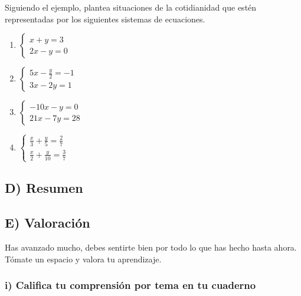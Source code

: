 \documentclass[12pt,a4paper]{article}
\begin{document}
Siguiendo el ejemplo, plantea situaciones de la cotidianidad que estén representadas por los siguientes sistemas de ecuaciones.

\begin{enumerate}[label=\alph*)]
    \item $\begin{cases} x + y = 3 \\ 2x - y = 0 \end{cases}$

    \item $\begin{cases} 5x - \frac{y}{2} = -1 \\ 3x - 2y = 1 \end{cases}$

    \item $\begin{cases} -10x - y = 0 \\ 21x - 7y = 28 \end{cases}$

    \item $\begin{cases} \frac{x}{3} + \frac{y}{5} = \frac{2}{7} \\ \frac{x}{2} + \frac{y}{10} = \frac{3}{7} \end{cases}$
\end{enumerate}

\vspace{1.5cm}

\subsection*{D) Resumen}

\vspace{1.5cm}

\subsection*{E) Valoración}

Has avanzado mucho, debes sentirte bien por todo lo que has hecho hasta ahora. Tómate un espacio y valora tu aprendizaje.

\subsubsection*{i) Califica tu comprensión por tema en tu cuaderno}
\end{document}
